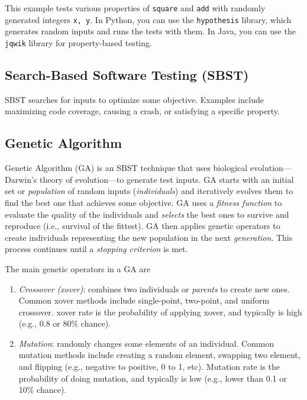 \documentclass[oneside,11pt,dvipsnames]{book}
\newcommand{\code}[1]{\texttt{#1}}
\begin{document}
This example tests various properties of \code{square} and \code{add} with randomly generated integers \code{x, y}. In Python, you can use the \code{hypothesis} library, which generates random inputs and runs the tests with them. In Java, you can use the \code{jqwik} library for property-based testing.


\subsection{Search-Based Software Testing (SBST)}
SBST searches for inputs to optimize some objective. Examples include maximizing code coverage, causing a crash, or satisfying a specific property. 
\subsection{Genetic Algorithm}\label{sec:ga}

Genetic Algorithm (GA) is an SBST technique that uses biological evolution---Darwin's theory of evolution---to generate test inputs.
GA starts with an initial set or \emph{population} of random inputs (\emph{individuals}) and iteratively evolves them to find the best one that achieves some objective. GA uses a \emph{fitness function} to evaluate the quality of the individuals and \emph{selects} the best ones to survive and reproduce (i.e., survival of the fittest). GA then applies genetic operators to create individuals representing the new population in the next \emph{generation}. This process continues until a \emph{stopping criterion} is met.

The main genetic operators in a GA are
\begin{enumerate}
    \item \emph{Crossover (xover)}: combines two individuals or \emph{parents} to create new ones. Common xover methods include single-point, two-point, and uniform crossover. xover rate is the probability of applying xover, and typically is high (e.g., 0.8 or 80\% chance).
    \item \emph{Mutation}: randomly changes some elements of an individual. Common mutation methods include creating a random element, swapping two element, and flipping (e.g., negative to positive, 0 to 1, etc). Mutation rate is the probability of doing mutation, and typically is low (e.g., lower than 0.1 or 10\% chance).
\end{enumerate}
\end{document}
